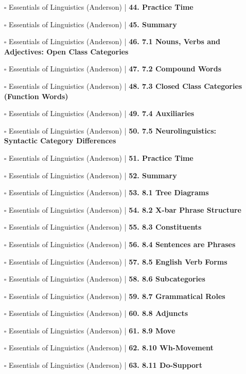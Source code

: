 \documentclass[a4, landscape, 12pt]{article}
\newcommand{\checkbox}{$\square$}%
\begin{document}
\begin{itemize}
{}
\item [\checkbox]  Essentials of Linguistics (Anderson) | \textbf{ 44. Practice Time
}
\item [\checkbox]  Essentials of Linguistics (Anderson) | \textbf{ 45. Summary
}
\item [\checkbox]  Essentials of Linguistics (Anderson) | \textbf{ 46. 7.1 Nouns, Verbs and Adjectives: Open Class Categories
}
\item [\checkbox]  Essentials of Linguistics (Anderson) | \textbf{ 47. 7.2 Compound Words
}
\item [\checkbox]  Essentials of Linguistics (Anderson) | \textbf{ 48. 7.3 Closed Class Categories (Function Words)
}
\item [\checkbox]  Essentials of Linguistics (Anderson) | \textbf{ 49. 7.4 Auxiliaries
}
\item [\checkbox]  Essentials of Linguistics (Anderson) | \textbf{ 50. 7.5 Neurolinguistics: Syntactic Category Differences
}
\item [\checkbox]  Essentials of Linguistics (Anderson) | \textbf{ 51. Practice Time
}
\item [\checkbox]  Essentials of Linguistics (Anderson) | \textbf{ 52. Summary
}
\item [\checkbox]  Essentials of Linguistics (Anderson) | \textbf{ 53. 8.1 Tree Diagrams
}
\item [\checkbox]  Essentials of Linguistics (Anderson) | \textbf{ 54. 8.2 X-bar Phrase Structure
}
\item [\checkbox]  Essentials of Linguistics (Anderson) | \textbf{ 55. 8.3 Constituents
}
\item [\checkbox]  Essentials of Linguistics (Anderson) | \textbf{ 56. 8.4 Sentences are Phrases
}
\item [\checkbox]  Essentials of Linguistics (Anderson) | \textbf{ 57. 8.5 English Verb Forms
}
\item [\checkbox]  Essentials of Linguistics (Anderson) | \textbf{ 58. 8.6 Subcategories
}
\item [\checkbox]  Essentials of Linguistics (Anderson) | \textbf{ 59. 8.7 Grammatical Roles
}
\item [\checkbox]  Essentials of Linguistics (Anderson) | \textbf{ 60. 8.8 Adjuncts
}
\item [\checkbox]  Essentials of Linguistics (Anderson) | \textbf{ 61. 8.9 Move
}
\item [\checkbox]  Essentials of Linguistics (Anderson) | \textbf{ 62. 8.10 Wh-Movement
}
\item [\checkbox]  Essentials of Linguistics (Anderson) | \textbf{ 63. 8.11 Do-Support
}
\end{itemize}
\end{document}
